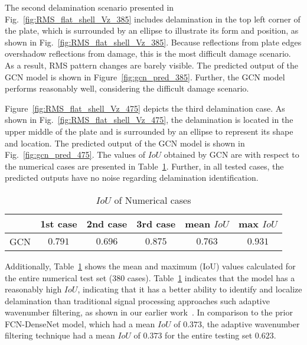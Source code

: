 \documentclass[runningheads]{llncs}
\begin{document}
The second delamination scenario presented in Fig.~\ref{fig:RMS_flat_shell_Vz_385} includes delamination in the top left corner of the plate, which is surrounded by an ellipse to illustrate its form and position, as shown in Fig.~\ref{fig:RMS_flat_shell_Vz_385}.
Because reflections from plate edges overshadow reflections from damage, this is the most difficult damage scenario.
As a result, RMS pattern changes are barely visible.
The predicted output of the GCN model is shown in Figure~\ref{fig:gcn_pred_385}. 
Further, the GCN model performs reasonably well, considering the difficult damage scenario.

Figure~\ref{fig:RMS_flat_shell_Vz_475} depicts the third delamination case.
As shown in Fig.~\ref{fig:RMS_flat_shell_Vz_475}, the delamination is located in the upper middle of the plate and is surrounded by an ellipse to represent its shape and location.
The predicted output of the GCN model is shown in Fig.~\ref{fig:gcn_pred_475}.
The values of \(IoU\) obtained by GCN are with respect to the numerical cases are presented in Table~\ref{tab:table_numerical_scenarios}.
Further, in all tested cases, the predicted outputs have no noise regarding delamination identification.
\begin{table}[]
	\centering
	\caption{\(IoU\) of Numerical cases}
	\label{tab:table_numerical_scenarios}
	{
		\begin{tabular}{c|ccc|cc}
			\toprule
			 & 1st case & 2nd case & 3rd case & mean \(IoU\) & max \(IoU\) \\ 
			 \midrule 
			GCN & \(0.791\) & \(0.696\) & \(0.875\) & \(0.763\) & \(0.931\) \\ 
			\bottomrule
		\end{tabular}
	}
\end{table}

Additionally, Table~\ref{tab:table_numerical_scenarios} shows the mean and maximum (IoU) values calculated for the entire numerical test set (380 cases).
Table~\ref{tab:table_numerical_scenarios} indicates that the model has a reasonably high \(IoU\), indicating that it has a better ability to identify and localize delamination than traditional signal processing approaches such adaptive wavenumber filtering, as shown in our earlier work~\cite{Ijjeh2021}.
In comparison to the prior FCN-DenseNet model, which had a mean \(IoU\) of \(0.373\), the adaptive wavenumber filtering technique had a mean \(IoU\) of \(0.373\) for the entire testing set \(0.623\).
\end{document}
